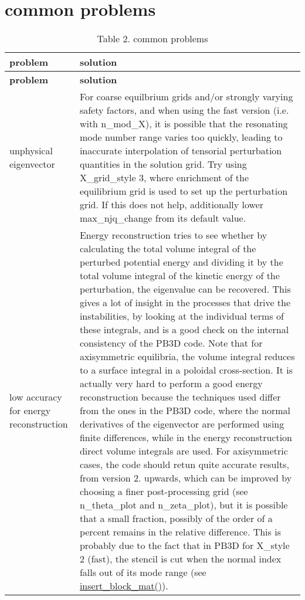 \hypertarget{page_faq_faq_problems}{}\section{common problems}\label{page_faq_faq_problems}
\hypertarget{page_faq_faq_problems_tab}{}
\tabulinesep=1mm
\begin{longtabu} spread 0pt [c]{*{2}{|X[-1]}|}
\caption{Table 2. common problems}\label{page_faq_faq_problems_tab}\\
\hline
\rowcolor{\tableheadbgcolor}\textbf{ problem }&\textbf{ solution   }\\
\endfirsthead
\hline
\endfoot
\hline
\rowcolor{\tableheadbgcolor}\textbf{ problem }&\textbf{ solution   }\\
\endhead
unphysical eigenvector &For coarse equilbrium grids and/or strongly varying safety factors, and when using the fast version (i.\+e. with {\ttfamily n\+\_\+mod\+\_\+X}), it is possible that the resonating mode number range varies too quickly, leading to inaccurate interpolation of tensorial perturbation quantities in the solution grid. Try using {\ttfamily X\+\_\+grid\+\_\+style} 3, where enrichment of the equilibrium grid is used to set up the perturbation grid. If this does not help, additionally lower {\ttfamily max\+\_\+njq\+\_\+change} from its default value.   \\
low accuracy for energy reconstruction &Energy reconstruction tries to see whether by calculating the total volume integral of the perturbed potential energy and dividing it by the total volume integral of the kinetic energy of the perturbation, the eigenvalue can be recovered. This gives a lot of insight in the processes that drive the instabilities, by looking at the individual terms of these integrals, and is a good check on the internal consistency of the P\+B3D code. Note that for axisymmetric equilibria, the volume integral reduces to a surface integral in a poloidal cross-\/section. It is actually very hard to perform a good energy reconstruction because the techniques used differ from the ones in the P\+B3D code, where the normal derivatives of the eigenvector are performed using finite differences, while in the energy reconstruction direct volume integrals are used. For axisymmetric cases, the code should retun quite accurate results, from version 2. upwards, which can be improved by choosing a finer post-\/processing grid (see {\ttfamily n\+\_\+theta\+\_\+plot} and {\ttfamily n\+\_\+zeta\+\_\+plot}), but it is possible that a small fraction, possibly of the order of a percent remains in the relative difference. This is probably due to the fact that in P\+B3D for {\ttfamily X\+\_\+style} 2 (fast), the stencil is cut when the normal index falls out of its mode range (see \hyperlink{namespaceslepc__utilities_ae6568f825f3fa8a6e3d45f67f3daf412}{insert\+\_\+block\+\_\+mat()}).   \\
\end{longtabu}

